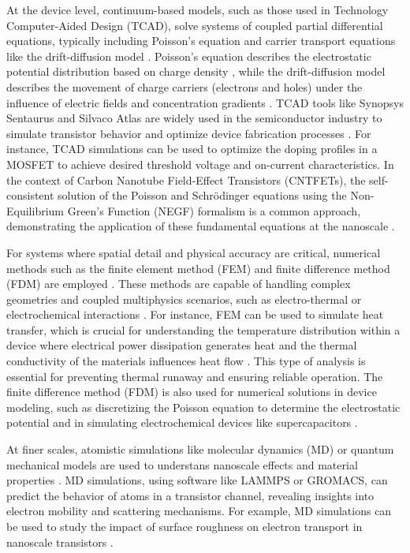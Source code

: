 At the device level, continuum-based models, such as those used in Technology Computer-Aided Design (TCAD), solve systems of coupled partial differential equations, typically including Poisson's equation and carrier transport equations like the drift-diffusion model \citep{markowichDrift1990}. Poisson's equation describes the electrostatic potential distribution based on charge density \citep{delavariNernst2021}, while the drift-diffusion model describes the movement of charge carriers (electrons and holes) under the influence of electric fields and concentration gradients \citep{markowichDrift1990}. TCAD tools like Synopsys Sentaurus and Silvaco Atlas are widely used in the semiconductor industry to simulate transistor behavior and optimize device fabrication processes \citep{tungaPhysicsBased2023}. For instance, TCAD simulations can be used to optimize the doping profiles in a MOSFET to achieve desired threshold voltage and on-current characteristics.  In the context of Carbon Nanotube Field-Effect Transistors (CNTFETs), the self-consistent solution of the Poisson and Schrödinger equations using the Non-Equilibrium Green's Function (NEGF) formalism is a common approach, demonstrating the application of these fundamental equations at the nanoscale \citep{hassaniniaSimulation2008,zandShortChannel2020}. 

For systems where spatial detail and physical accuracy are critical, numerical methods such as the finite element method (FEM) and finite difference method (FDM) are employed \citep{jagotaFinite2013,moghadamDesign2013}. These methods are capable of handling complex geometries and coupled multiphysics scenarios, such as electro-thermal or electrochemical interactions \citep{jagotaFinite2013,drummondLoworder2015}. For instance, FEM can be used to simulate heat transfer, which is crucial for understanding the temperature distribution within a device where electrical power dissipation generates heat and the thermal conductivity of the materials influences heat flow \citep{jagotaFinite2013}. This type of analysis is essential for preventing thermal runaway and ensuring reliable operation. The finite difference method (FDM) is also used for numerical solutions in device modeling, such as discretizing the Poisson equation to determine the electrostatic potential and in simulating electrochemical devices like supercapacitors \citep{moghadamDesign2013,drummondLoworder2015}. 

At finer scales, atomistic simulations like molecular dynamics (MD) or quantum mechanical models are used to understans nanoscale effects and material properties \citep{hayatiCNTMOSFET2010}. MD simulations, using software like LAMMPS or GROMACS, can predict the behavior of atoms in a transistor channel, revealing insights into electron mobility and scattering mechanisms. For example, MD simulations can be used to study the impact of surface roughness on electron transport in nanoscale transistors \citep{zhaoUnderstanding2018}.

